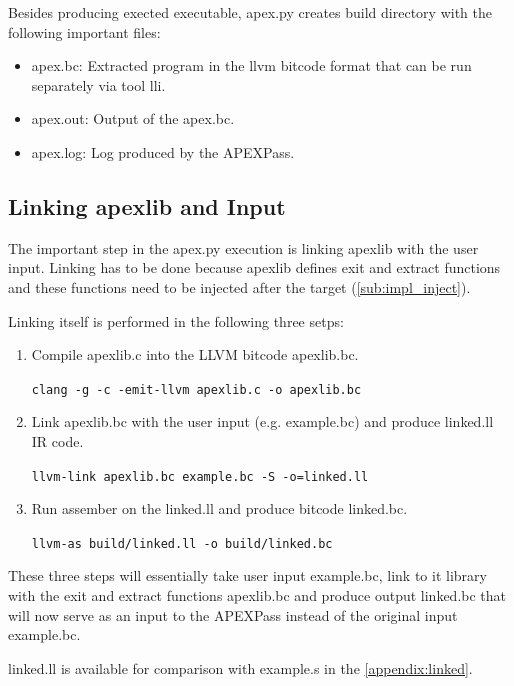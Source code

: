 \documentclass[12pt, twoside]{fithesis2}
\renewcommand{\_}{\leavevmode \kern0.07em\vbox{\hrule width0.4em}}
\newcommand{\squarebullet}{\textcolor{black}{\raisebox{0.15em}{\rule{4pt}{4pt}}}}
\newenvironment{myItemize}{
  \begin{itemize}[
    leftmargin=2em,
    rightmargin=1em,
    itemsep=\parskip,
    parsep=0em,
    topsep=0em,
    partopsep=0em
]
  \renewcommand{\labelitemi}{\squarebullet}
  \renewcommand{\labelitemii}{\textbullet}
}{
  \end{itemize}
}
\newenvironment{myEnumerate}{
  \begin{enumerate}[
    leftmargin=2em,
    rightmargin=1em,
    itemsep=\parskip,
    parsep=0em,
    topsep=0em,
    partopsep=0em
]
}{
  \end{enumerate}
}
\begin{document}
Besides producing exected executable, apex.py creates build directory with the
following important files:

\begin{myItemize}
\item apex.bc: Extracted program in the llvm bitcode format that can be run separately
via tool lli.
\item apex.out: Output of the apex.bc.
\item apex.log: Log produced by the APEXPass.
\end{myItemize}

\subsection{Linking apexlib and Input}

The important step in the apex.py execution is linking apexlib with the user
input. Linking has to be done because apexlib defines exit and extract
functions and these functions need to be injected after the target
(\autoref{sub:impl_inject}).

Linking itself is performed in the following three setps:
\begin{myEnumerate}
\item Compile apexlib.c into the LLVM bitcode apexlib.bc.

\texttt{clang -g -c -emit-llvm apexlib.c -o apexlib.bc}

\item Link apexlib.bc with the user input (e.g. example.bc) and produce linked.ll
IR code.

\texttt{llvm-link apexlib.bc example.bc -S -o=linked.ll}

\item Run assember on the linked.ll and produce bitcode linked.bc.

\texttt{llvm-as build/linked.ll -o build/linked.bc}

\end{myEnumerate}

These three steps will essentially take user input example.bc, link to it
library with the exit and extract functions apexlib.bc and produce output
linked.bc that will now serve as an input to the APEXPass instead of the original
input example.bc.

linked.ll is available for comparison with example.s in the
\autoref{appendix:linked}.
\end{document}
